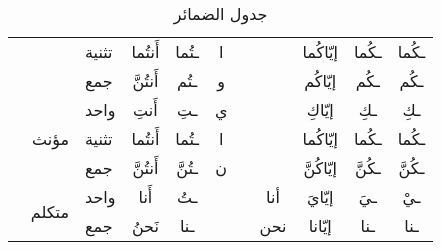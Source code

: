 \documentclass[../main.tex]{subfiles}
\begin{document}
\begin{table}[H]
\begin{tabular}{lll|ccccc|cc|c|}
\multicolumn{1}{|l|}{} & \multicolumn{1}{l|}{} & تثنية & \multicolumn{1}{c|}{أَنتُما} & \multicolumn{1}{c|}{ـتُما} & \multicolumn{1}{c|}{ا} & \multicolumn{1}{c|}{} &  & \multicolumn{1}{c|}{إيّاكُما} & ـكُما & ـكُما \\ \cline{3-11} 
\multicolumn{1}{|l|}{} & \multicolumn{1}{l|}{} & جمع & \multicolumn{1}{c|}{أَنتُنَّ} & \multicolumn{1}{c|}{ـتُم} & \multicolumn{1}{c|}{و} & \multicolumn{1}{c|}{} &  & \multicolumn{1}{c|}{إيّاكُم} & ـكُم & ـكُم \\ \cline{2-11} 
\multicolumn{1}{|l|}{} & \multicolumn{1}{l|}{\multirow{3}{*}{مؤنث}} & واحد & \multicolumn{1}{c|}{أَنتِ} & \multicolumn{1}{c|}{ـتِ} & \multicolumn{1}{c|}{ي} & \multicolumn{1}{c|}{} &  & \multicolumn{1}{c|}{إيّاكِ} & ـكِ & ـكِ \\ \cline{3-11} 
\multicolumn{1}{|l|}{} & \multicolumn{1}{l|}{} & تثنية & \multicolumn{1}{c|}{أَنتُما} & \multicolumn{1}{c|}{ـتُما} & \multicolumn{1}{c|}{ا} & \multicolumn{1}{c|}{} &  & \multicolumn{1}{c|}{إيّاكُما} & ـكُما & ـكُما \\ \cline{3-11} 
\multicolumn{1}{|l|}{} & \multicolumn{1}{l|}{} & جمع & \multicolumn{1}{c|}{أَنتُنَّ} & \multicolumn{1}{c|}{ـتُنَّ} & \multicolumn{1}{c|}{ن} & \multicolumn{1}{c|}{} &  & \multicolumn{1}{c|}{إيّاكُنَّ} & ـكُنَّ & ـكُنَّ \\ \hline
\multicolumn{2}{|r|}{\multirow{2}{*}{متكلم}} & واحد & \multicolumn{1}{c|}{أَنا} & \multicolumn{1}{c|}{ـتُ} & \multicolumn{1}{c|}{} & \multicolumn{1}{c|}{} & أنا & \multicolumn{1}{c|}{إيّايَ} & ـيَ & ـيْ \\ \cline{3-11} 
\multicolumn{2}{|r|}{} & جمع & \multicolumn{1}{c|}{نَحنُ} & \multicolumn{1}{c|}{ـنا} & \multicolumn{1}{c|}{} & \multicolumn{1}{c|}{} & نحن & \multicolumn{1}{c|}{إيّانا} & ـنا & ـنا \\ \hline
\end{tabular}
\caption{جدول الضمائر}
\label{table:dameer}
\end{table}
\end{document}
